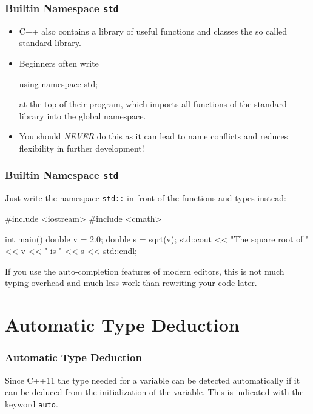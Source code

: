\documentclass[aspectratio=169,ignorenonframetext,11pt]{beamer}
\def\inline{\lstinline[basicstyle=\small\ttfamily]}
\begin{document}
\begin{frame}[fragile]
  \frametitle{Builtin Namespace \texttt{std}}
  \begin{itemize}
  \item C++ also contains a library of useful functions and classes the so called standard library. 
  \item Beginners often write 
  \begin{cppcode}
  using namespace std;
  \end{cppcode}
at the top of their program, which imports all functions of the standard library into the global namespace.
  \item You should \emph{NEVER} do this as it can lead to name conflicts and reduces flexibility in further development!
  \end{itemize}
  
\end{frame}

\begin{frame}[fragile]
  \frametitle<presentation>{Builtin Namespace \texttt{std}}
Just write the namespace \inline!std::! in front of the functions and types instead:
  \begin{cppcode}
#include <iostream>
#include <cmath>

int main()
{
  double v = 2.0;
  double s = sqrt(v);
  std::cout << "The square root of " << v
            << " is " << s << std::endl;
}
  \end{cppcode}
  If you use the auto-completion features of modern editors, this is not much typing overhead and much less work than rewriting your code later.
\end{frame}

\section{Automatic Type Deduction}

\begin{frame}
\frametitle<presentation>{Automatic Type Deduction}

Since C++11 the type needed for a variable can be detected automatically if it can be deduced from the initialization of the variable. This is indicated with the keyword \inline!auto!.

\begin{codeblock}
  
\end{codeblock}
\end{frame}
\end{document}
